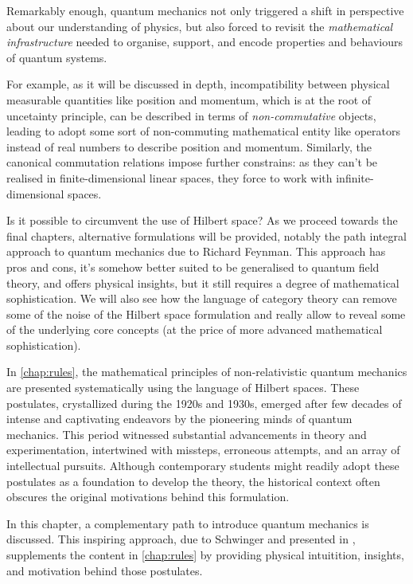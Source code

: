 \begin{refsection}
  Remarkably enough, quantum mechanics not only triggered a shift in perspective about our understanding of physics, but also forced to revisit the \emph{mathematical infrastructure} needed to organise, support, and encode properties and behaviours of quantum systems.


For example, as it will be discussed in depth, incompatibility between physical measurable quantities like position and
momentum, which is at the root of uncetainty principle, can be described in
terms of \emph{non-commutative} objects, leading to adopt some sort of non-commuting mathematical entity like 
operators instead of real numbers to describe position and momentum.
Similarly, 
  the canonical commutation relations impose further
constrains: as they can't be realised in finite-dimensional linear spaces,
  they force to work with infinite-dimensional spaces. 

Is it possible to circumvent the use of Hilbert space?
As we proceed towards the final chapters,
  alternative formulations will be provided, notably
  the path integral approach to quantum mechanics due to Richard Feynman. This approach has pros and cons, it's somehow better suited to be generalised to quantum field theory, and offers physical insights, but it still requires a degree of mathematical sophistication. We will also see how the language of category theory can remove some of the noise of the Hilbert space formulation and really allow to reveal some of the underlying core concepts (at the price of more advanced mathematical sophistication). 

  In \cref{chap:rules}, the mathematical principles of non-relativistic quantum mechanics are presented systematically using the language of Hilbert spaces. These postulates, crystallized during the 1920s and 1930s, emerged after few decades of intense and captivating endeavors by the pioneering minds of quantum mechanics. This period witnessed substantial advancements in theory and experimentation, intertwined with missteps, erroneous attempts, and an array of intellectual pursuits. Although contemporary students might readily adopt these postulates as a foundation to develop the theory, the historical context often obscures the original motivations behind this formulation.

  In this chapter, a complementary path to introduce quantum mechanics is discussed.
This inspiring approach, due to Schwinger and presented in \textcite{Schwinger:2001}, 
supplements  the content in \cref{chap:rules} by providing physical intuitition, insights, and motivation behind those postulates.


\end{refsection}
